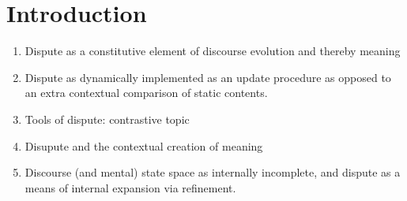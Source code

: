 \documentclass[letterpaper,10pt]{article}
\begin{document}
\section{Introduction}

\begin{enumerate}
  \item Dispute as a constitutive element of discourse evolution and thereby meaning
  \item Dispute as dynamically implemented as an update procedure as opposed to an extra contextual comparison of static contents.
  \item Tools of dispute: contrastive topic
  \item Disupute and the contextual creation of meaning
  \item Discourse (and mental) state space as internally incomplete, and dispute as a means of internal expansion via refinement.
\end{enumerate}
\end{document}
